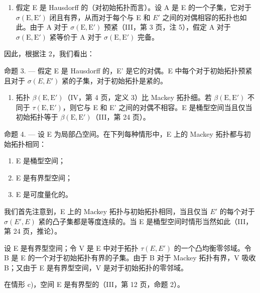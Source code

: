 \begin{enumerate}
\def\labelenumi{\arabic{enumi})}
\setcounter{enumi}{2}
\tightlist
\item
  假定 E 是 Hausdorff 的（对初始拓扑而言）。设 A 是 E 的一个子集，它对于 \(\sigma(\mathrm{E}, \mathrm{E}')\) 闭且有界，从而对于每个与 E 和 \(E'\) 之间的对偶相容的拓扑也如此。由于 A 对于 \(\sigma(\mathrm{E}, \mathrm{E}')\) 预紧（III，第 3 页，注 5），假定 A 对于 \(\sigma(\mathrm{E}, \mathrm{E}')\) 紧等价于 A 对于 \(\sigma(\mathrm{E}, \mathrm{E}')\) 完备。
\end{enumerate}

因此，根据注 2，我们看出：

命题 3. --- 假定 E 是 Hausdorff 的，E' 是它的对偶。E 中每个对于初始拓扑预紧且对于 \(\sigma(E, E')\) 紧的子集，对于初始拓扑是紧的。

\begin{enumerate}
\def\labelenumi{\arabic{enumi})}
\setcounter{enumi}{3}
\tightlist
\item
  拓扑 \(\beta(\mathrm{E},\mathrm{E}')\)（IV，第 4 页，定义 3）比 Mackey 拓扑细。若 \(\beta(\mathrm{E},\mathrm{E}')\) 不同于 \(\tau(\mathrm{E},\mathrm{E}')\)，则它与 E 和 E' 之间的对偶不相容。E 是桶型空间当且仅当初始拓扑等于 \(\beta(\mathrm{E},\mathrm{E}')\)（III，第 24 页）。
\end{enumerate}

命题 4. --- 设 E 为局部凸空间。在下列每种情形中，E 上的 Mackey 拓扑都与初始拓扑相同：

\begin{enumerate}
\def\labelenumi{\alph{enumi})}
\item
  E 是桶型空间；
\item
  E 是有界型空间；
\item
  E 是可度量化的。
\end{enumerate}

我们首先注意到，E 上的 Mackey 拓扑与初始拓扑相同，当且仅当 \(E'\) 的每个对于 \(\sigma(E', E)\) 紧的凸子集都是等度连续的。当 E 是桶型空间时情形当然如此（III，第 24 页，推论）。

设 E 是有界型空间；令 V 是 E 中对于拓扑 \(\tau(E, E')\) 的一个凸均衡零邻域。令 B 是 E 的一个对于初始拓扑有界的子集。由于 B 对于 Mackey 拓扑有界，V 吸收 B；又由于 E 是有界型空间，V 是对于初始拓扑的零邻域。

在情形 c)，空间 E 是有界型的（III，第 12 页，命题 2）。

